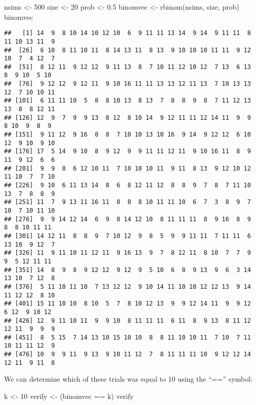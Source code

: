 \documentclass[
]{book}
\newenvironment{Shaded}{\begin{snugshade}}{\end{snugshade}}
\newcommand{\DecValTok}[1]{\textcolor[rgb]{0.00,0.00,0.81}{#1}}
\newcommand{\FloatTok}[1]{\textcolor[rgb]{0.00,0.00,0.81}{#1}}
\newcommand{\FunctionTok}[1]{\textcolor[rgb]{0.00,0.00,0.00}{#1}}
\newcommand{\NormalTok}[1]{#1}
\newcommand{\OtherTok}[1]{\textcolor[rgb]{0.56,0.35,0.01}{#1}}
\newcommand{\SpecialCharTok}[1]{\textcolor[rgb]{0.00,0.00,0.00}{#1}}
\begin{document}
\begin{Shaded}
\begin{Highlighting}[]
\NormalTok{nsims }\OtherTok{\textless{}{-}} \DecValTok{500}
\NormalTok{size }\OtherTok{\textless{}{-}} \DecValTok{20}
\NormalTok{prob }\OtherTok{\textless{}{-}} \FloatTok{0.5}
\NormalTok{binomvec }\OtherTok{\textless{}{-}} \FunctionTok{rbinom}\NormalTok{(nsims, size, prob)}
\NormalTok{binomvec}
\end{Highlighting}
\end{Shaded}

\begin{verbatim}
##   [1] 14  9  8 10 14 10 12 10  6  9 11 11 13 14  9 14  9 11 11  8 11 10 13 11  9
##  [26]  6 10  8 11 10 11  8 14 13 11  8 13  9 10 10 10 11 11  9 12 10  7  4 12  7
##  [51]  8 12 11  9 12 12  9 11 13  8  7 10 11 12 10 12  7 13  6 13  8  9 10  5 10
##  [76]  9 12 12  9 12 11  9 10 16 11 11 13 13 12 11 13  7 10 13 13 12  7 10 10 11
## [101]  6 11 11 10  5  8  8 10 13  8 13  7  8  8  9  8  7 11 12 13 13  8  8 12 11
## [126] 12  9  7  9  9 13  8 12  8 10 14  9 12 11 11 12 14 11  9  9  8 10  9  8  9
## [151]  9 11 12  9 16  8  8  7 10 10 13 10 16  9 14  9 12 12  6 10 12  9 10  9 10
## [176] 17  5 14  9 10  8  9 12  9  9 11 11 12 11  9 10 16 11  8  9 11  9 12  6  6
## [201]  9  9  8  6 12 10 11  7 10 10 10 11  9 11  8 13  9 12 10 12 11 10  7  7 10
## [226]  9 10  6 11 13 14  8  6  8 12 11 12  8  8  9  7  8  7 11 10 13  7  8  8  9
## [251] 11  7  9 13 11 16 11  8  8  8 10 11 11 10  6  7  3  8  9  7 10  7 10 11 10
## [276]  9  9 14 12 14  6  9  8 14 12 10  8 11 11 11  8  9 16  8  9  8  8 10 11 11
## [301] 14 12 11  8  8  9  7 10 12  9  8  5  9  9 11 11  7 11 11  6 13 10  9 12  7
## [326] 11  9 11 10 11 12 11  9 16 13  9  7  8 12 11  8 10  7  7  9  9  5 12 11 11
## [351] 14  8  9  8  9 12 12  9 12  9  5 10  6  8  9 13  9  6  3 14 13 10  7 12  8
## [376]  5 11 10 11 10  7 13 12 12  9 10 14 11 10 10 12 12 13  9 14 11 12 12  8 10
## [401] 15 11 10 10  8 10  5  7  8 10 12 13  9  9 12 14 11  9  9 12  6 12  9 10 12
## [426] 12  9 11 10 11  9  9 10  8 11 11 11  6 11  8  9 13  8 11 12 12 11  9  9  9
## [451]  8  5 15  7 14 13 10 15 10 10  8  8 11 10 10 11  7 10  7 11 10 11 11 12  9
## [476] 10  9  9 11  9 13  9 10 11 12  7  8 11 11 11 10  9 12 12 14 12 11  9 11  8
\end{verbatim}

We can determine which of these trials was equal to 10 using the ``=='' symbol:

\begin{Shaded}
\begin{Highlighting}[]
\NormalTok{k }\OtherTok{\textless{}{-}} \DecValTok{10}
\NormalTok{verify }\OtherTok{\textless{}{-}}\NormalTok{ (binomvec }\SpecialCharTok{==}\NormalTok{ k)}
\NormalTok{verify}
\end{Highlighting}
\end{Shaded}
\end{document}
